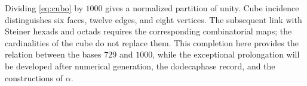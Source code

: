 Dividing \eqref{eq:cubo} by \(1000\) gives a normalized partition of unity. Cube incidence distinguishes six faces, twelve edges, and eight vertices. The subsequent link with Steiner hexads and octads requires the corresponding combinatorial maps; the cardinalities of the cube do not replace them. This completion here provides the relation between the bases \(729\) and \(1000\), while the exceptional prolongation will be developed after numerical generation, the dodecaphase record, and the constructions of \(\alpha\).






